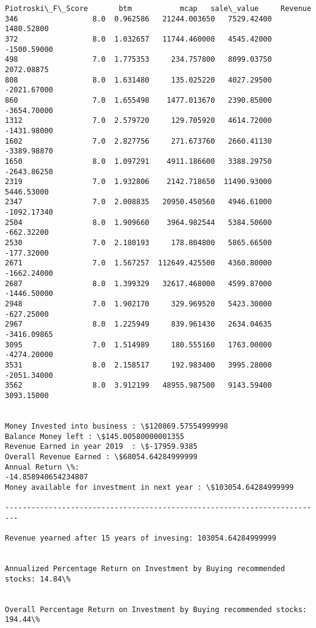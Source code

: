 \documentclass[11pt]{article}
\begin{document}
\begin{Verbatim}[commandchars=\\\{\}]
      Piotroski\_F\_Score       btm           mcap   sale\_value     Revenue
346                 8.0  0.962586   21244.003650   7529.42400  1480.52800
372                 8.0  1.032657   11744.460000   4545.42000 -1500.59000
498                 7.0  1.775353     234.757800   8099.03750  2072.08875
808                 8.0  1.631480     135.025220   4027.29500 -2021.67000
860                 7.0  1.655498    1477.013670   2390.85000 -3654.70000
1312                7.0  2.579720     129.705920   4614.72000 -1431.98000
1602                7.0  2.827756     271.673760   2660.41130 -3389.98870
1650                8.0  1.097291    4911.186600   3388.29750 -2643.86250
2319                7.0  1.932806    2142.718650  11490.93000  5446.53000
2347                7.0  2.008835   20950.450560   4946.61000 -1092.17340
2504                8.0  1.909660    3964.982544   5384.50600  -662.32200
2530                7.0  2.180193     178.804800   5865.66500  -177.32000
2671                7.0  1.567257  112649.425500   4360.80000 -1662.24000
2687                8.0  1.399329   32617.468000   4599.87000 -1446.50000
2948                7.0  1.902170     329.969520   5423.30000  -627.25000
2967                8.0  1.225949     839.961430   2634.04635 -3416.09865
3095                7.0  1.514989     180.555160   1763.00000 -4274.20000
3531                8.0  2.158517     192.983400   3995.28000 -2051.34000
3562                8.0  3.912199   48955.987500   9143.59400  3093.15000


Money Invested into business : \$120869.57554999998
Balance Money left : \$145.00580000001355
Revenue Earned in year 2019  : \$-17959.9385
Overall Revenue Earned : \$68054.64284999999
Annual Return \%:
-14.858940654234807
Money available for investment in next year : \$103054.64284999999

-------------------------------------------------------------------------

Revenue yearned after 15 years of invesing: 103054.64284999999


Annualized Percentage Return on Investment by Buying recommended stocks: 14.84\%


Overall Percentage Return on Investment by Buying recommended stocks: 194.44\%
    \end{Verbatim}
\end{document}
